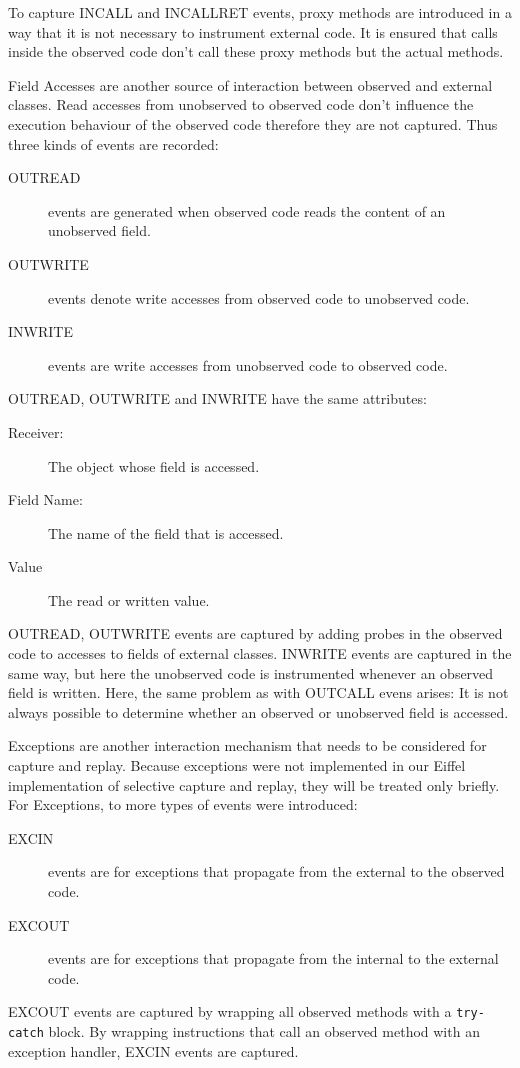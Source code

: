 To capture INCALL and INCALLRET events, proxy methods are introduced in a way that it is not necessary to instrument external code. It is ensured that calls inside the observed code don't call these proxy methods but the actual methods.

Field Accesses are another source of interaction between observed and external classes. Read accesses from unobserved to observed code don't influence the execution behaviour of the observed code therefore they are not captured. Thus three kinds of events are recorded:

\begin{description}
 \item [OUTREAD] events are generated when observed code reads the content of an unobserved field.
 \item [OUTWRITE] events denote write accesses from observed code to unobserved code.
 \item [INWRITE] events are write accesses from unobserved code to observed code.
\end{description}

OUTREAD, OUTWRITE and INWRITE have the same attributes:

\begin{description}
 \item [Receiver:] The object whose field is accessed.
 \item [Field Name:] The name of the field that is accessed.
 \item [Value] The read or written value.
\end{description}

OUTREAD, OUTWRITE events are captured by adding probes in the observed code to accesses to fields of external classes. INWRITE events are captured in the same way, but here the unobserved code is instrumented whenever an observed field is written. Here, the same problem as with OUTCALL evens arises: It is not always possible to determine whether an observed or unobserved field is accessed.

Exceptions are another interaction mechanism that needs to be considered for capture and replay. Because exceptions were not implemented in our Eiffel implementation of selective capture and replay, they will be treated only briefly. For Exceptions, to more types of events were introduced:
\begin{description}
 \item [EXCIN] events are for exceptions that propagate from the external to the observed code.
 \item [EXCOUT] events are for exceptions that propagate from the internal to the external code.
\end{description}
EXCOUT events are captured by wrapping all observed methods with a \texttt{try-catch} block. By wrapping instructions that call an observed method with an exception handler,  EXCIN events are captured.

